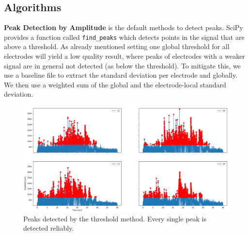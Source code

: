 \documentclass[11pt, twocolumn]{article}
\begin{document}
\subsection{Algorithms}
    \textbf{Peak Detection by Amplitude} is the default methods to detect peaks. SciPy provides a function called \texttt{find\_peaks} which detects points in the signal that are above a threshold. As already mentioned setting one global threshold for all electrodes will yield a low quality result, where peaks of electrodes with a weaker signal are in general not detected (as below the threshold). To mitigate this, we use a baseline file to extract the standard deviation per electrode and globally. We then use a weighted sum of the global and the electrode-local standard deviation.
    \begin{figure}
     \begin{center}
      \includegraphics[keepaspectratio, width=\linewidth]{img/4_peaks_amplitude.png}
     \end{center}
		\caption{Peaks detected by the threshold method. Every single peak is detected reliably.}
    \end{figure}
\end{document}
